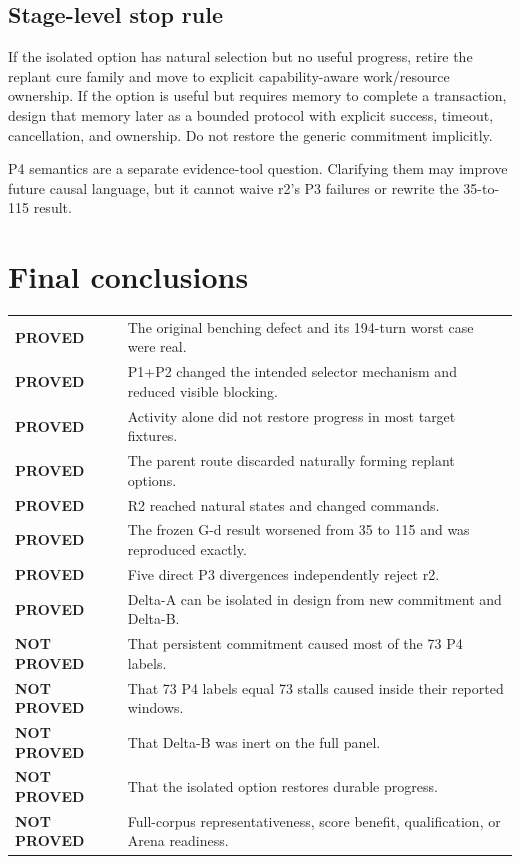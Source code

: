 \documentclass[10pt,a4paper]{article}
\newcommand{\yes}{\textcolor{good}{\textbf{PROVED}}}
\newcommand{\no}{\textcolor{bad}{\textbf{NOT PROVED}}}
\begin{document}
\subsection{Stage-level stop rule}

If the isolated option has natural selection but no useful progress, retire the replant cure family
and move to explicit capability-aware work/resource ownership. If the option is useful but requires
memory to complete a transaction, design that memory later as a bounded protocol with explicit
success, timeout, cancellation, and ownership. Do not restore the generic commitment implicitly.

P4 semantics are a separate evidence-tool question. Clarifying them may improve future causal
language, but it cannot waive r2's P3 failures or rewrite the 35-to-115 result.

\section{Final conclusions}

\begin{tabularx}{\textwidth}{@{}p{40mm}Y@{}}
\toprule
\yes & The original benching defect and its 194-turn worst case were real. \\
\yes & P1+P2 changed the intended selector mechanism and reduced visible blocking. \\
\yes & Activity alone did not restore progress in most target fixtures. \\
\yes & The parent route discarded naturally forming replant options. \\
\yes & R2 reached natural states and changed commands. \\
\yes & The frozen G-d result worsened from 35 to 115 and was reproduced exactly. \\
\yes & Five direct P3 divergences independently reject r2. \\
\yes & Delta-A can be isolated in design from new commitment and Delta-B. \\
\midrule
\no & That persistent commitment caused most of the 73 P4 labels. \\
\no & That 73 P4 labels equal 73 stalls caused inside their reported windows. \\
\no & That Delta-B was inert on the full panel. \\
\no & That the isolated option restores durable progress. \\
\no & Full-corpus representativeness, score benefit, qualification, or Arena readiness. \\
\bottomrule
\end{tabularx}
\end{document}
